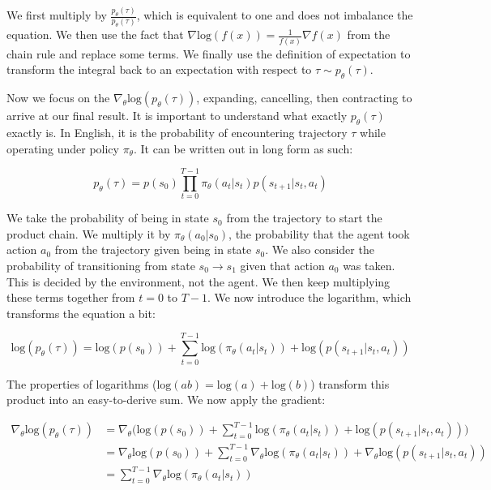 \begin{flushleft}
    We first multiply by $\frac{p_{\theta}(\tau)}{p_{\theta}(\tau)}$, which is equivalent to one and does not imbalance the equation. We then use the fact that $\nabla \mathrm{log}(f(x)) = \frac{1}{f(x)}\nabla f(x)$ from the chain rule and replace some terms. We finally use the definition of expectation to transform the integral back to an expectation with respect to $\tau \sim p_\theta(\tau)$. \break

    Now we focus on the $\nabla_\theta \mathrm{log}(p_\theta(\tau))$, expanding, cancelling, then contracting to arrive at our final result. It is important to understand what exactly $p_\theta(\tau)$ exactly is. In English, it is the probability of encountering trajectory $\tau$ while operating under policy $\pi_\theta$. It can be written out in long form as such:

    $$p_\theta(\tau) = p(s_0) \prod_{t=0}^{T-1} \pi_\theta(a_t|s_t)p(s_{t+1}|s_t,a_t)$$

    We take the probability of being in state $s_0$ from the trajectory to start the product chain. We multiply it by $\pi_\theta(a_0|s_0)$, the probability that the agent took action $a_0$ from the trajectory given being in state $s_0$. We also consider the probability of transitioning from state $s_0 \rightarrow s_1$ given that action $a_0$ was taken. This is decided by the environment, not the agent. We then keep multiplying these terms together from $t=0$ to $T-1$. We now introduce the logarithm, which transforms the equation a bit:

    $$\mathrm{log}(p_\theta(\tau)) = \mathrm{log}(p(s_0)) + \sum_{t=0}^{T-1} \mathrm{log}(\pi_\theta(a_t|s_t)) + \mathrm{log}(p(s_{t+1}|s_t,a_t))$$

    The properties of logarithms ($\mathrm{log}(ab) = \mathrm{log}(a) + \mathrm{log}(b)$) transform this product into an easy-to-derive sum. We now apply the gradient:
    
    \begin{align*}
        \nabla_\theta \mathrm{log}(p_\theta(\tau)) &= \nabla_\theta \biggl(\mathrm{log}(p(s_0)) + \sum_{t=0}^{T-1} \mathrm{log}(\pi_\theta(a_t|s_t)) + \mathrm{log}(p(s_{t+1}|s_t,a_t))\biggr)\\
        &= \nabla_\theta \mathrm{log}(p(s_0)) + \sum_{t=0}^{T-1} \nabla_\theta\mathrm{log}(\pi_\theta(a_t|s_t)) + \nabla_\theta\mathrm{log}(p(s_{t+1}|s_t,a_t)) \\
        &= \sum_{t=0}^{T-1} \nabla_\theta\mathrm{log}(\pi_\theta(a_t|s_t))
    \end{align*}


\end{flushleft}
